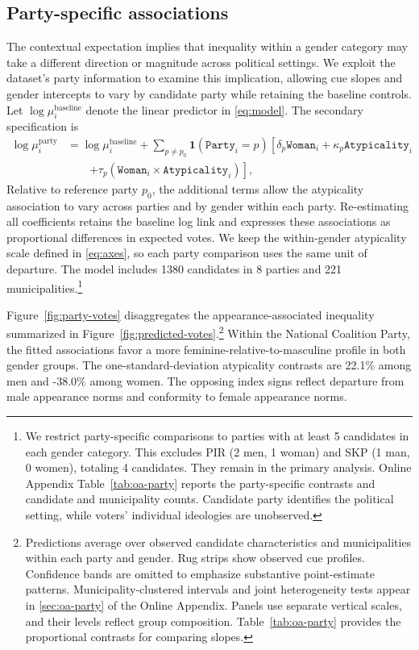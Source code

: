 \documentclass[11pt,a4paper]{article}\usepackage[]{graphicx}\usepackage[]{xcolor}
\begin{document}
\subsection{Party-specific associations}
The contextual expectation implies that inequality within a gender category may take a different direction or magnitude across political settings. We exploit the dataset's party information to examine this implication, allowing cue slopes and gender intercepts to vary by candidate party while retaining the baseline controls. Let $\log\mu_i^{\mathrm{baseline}}$ denote the linear predictor in \autoref{eq:model}. The secondary specification is
\begin{equation}
\begin{aligned}
 \log\mu_i^{\mathrm{party}} &= \log\mu_i^{\mathrm{baseline}}
 +\sum_{p\ne p_0}\mathbf{1}(\texttt{Party}_i=p)
 \left[\delta_p\texttt{Woman}_i+\kappa_p\texttt{Atypicality}_i\right.
 \\[-0.1em]
 &\qquad\left.+\tau_p(\texttt{Woman}_i\times\texttt{Atypicality}_i)\right],
\end{aligned}
\label{eq:party-model}
\end{equation}
Relative to reference party $p_0$, the additional terms allow the atypicality association to vary across parties and by gender within each party. Re-estimating all coefficients retains the baseline log link and expresses these associations as proportional differences in expected votes. We keep the within-gender atypicality scale defined in \autoref{eq:axes}, so each party comparison uses the same unit of departure. The model includes 1380 candidates in 8 parties and 221 municipalities.\footnote{We restrict party-specific comparisons to parties with at least 5 candidates in each gender category. This excludes PIR (2 men, 1 woman) and SKP (1 man, 0 women), totaling 4 candidates. They remain in the primary analysis. Online Appendix Table~\ref{tab:oa-party} reports the party-specific contrasts and candidate and municipality counts. Candidate party identifies the political setting, while voters' individual ideologies are unobserved.}

Figure~\ref{fig:party-votes} disaggregates the appearance-associated inequality summarized in Figure~\ref{fig:predicted-votes}.\footnote{Predictions average over observed candidate characteristics and municipalities within each party and gender. Rug strips show observed cue profiles. Confidence bands are omitted to emphasize substantive point-estimate patterns. Municipality-clustered intervals and joint heterogeneity tests appear in \autoref{sec:oa-party} of the Online Appendix. Panels use separate vertical scales, and their levels reflect group composition. Table~\ref{tab:oa-party} provides the proportional contrasts for comparing slopes.} Within the National Coalition Party, the fitted associations favor a more feminine-relative-to-masculine profile in both gender groups. The one-standard-deviation atypicality contrasts are 22.1\% among men and -38.0\% among women. The opposing index signs reflect departure from male appearance norms and conformity to female appearance norms.
\end{document}
